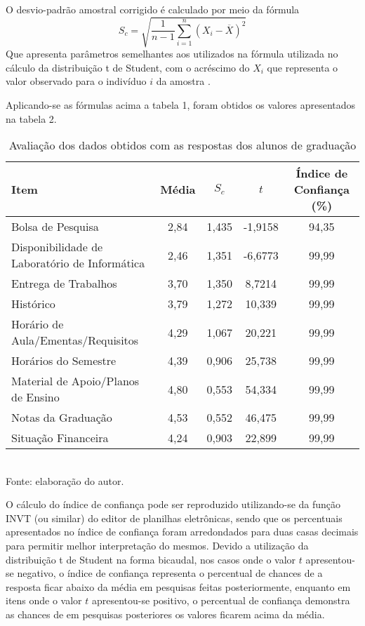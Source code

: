 O desvio-padrão amostral corrigido é calculado por meio da fórmula 
\[
   S_c = \sqrt{\frac{1}{n-1} \sum_{i=1}^n(X_i - \overline{X})^2} 
\]
Que apresenta parâmetros semelhantes aos utilizados na fórmula utilizada no cálculo da distribuição t de Student, com o acréscimo do $X_i$ que representa o valor observado para o indivíduo $i$ da amostra
\cite{DistroStudent}.

Aplicando-se as fórmulas acima a tabela 1, foram obtidos os valores apresentados na tabela 2.

\begin{table}[!hbt]
\centering
\caption[Avaliação dos dados obtidos - Graduação]{Avaliação dos dados obtidos com as respostas dos alunos de graduação}
\vspace{3mm}
\begin{tabular}{p{5cm}|c|c|c|c}\hline
\textbf{Item} & \textbf{Média} & \textbf{$S_c$} & \textbf{$t$} & \textbf{Índice de Confiança (\%)} \\ \hline
Bolsa de Pesquisa & 2,84 & 1,435 & -1,9158 & 94,35 \\ \hline
Disponibilidade de Laboratório de Informática & 2,46 & 1,351 & -6,6773 & 99,99 \\ \hline
Entrega de Trabalhos & 3,70 & 1,350 & 8,7214 & 99,99 \\ \hline
Histórico & 3,79 & 1,272 & 10,339 & 99,99 \\ \hline
Horário de Aula/Ementas/Requisitos & 4,29 & 1,067 & 20,221 & 99,99  \\ \hline
Horários do Semestre & 4,39 & 0,906 & 25,738 & 99,99 \\ \hline
Material de Apoio/Planos de Ensino & 4,80 & 0,553 & 54,334 & 99,99 \\ \hline
Notas da Graduação & 4,53 & 0,552 & 46,475 & 99,99 \\ \hline
Situação Financeira & 4,24 & 0,903 & 22,899 & 99,99 \\ \hline
\end{tabular}
\\ Fonte: elaboração do autor.
\end{table}

O cálculo do índice de confiança pode ser reproduzido utilizando-se da função INVT (ou similar) do editor de planilhas eletrônicas, sendo que os percentuais apresentados no índice de confiança foram arredondados para duas casas decimais para permitir melhor interpretação do mesmos. 
Devido a utilização da  distribuição t de Student na forma bicaudal, nos casos onde o valor $t$ apresentou-se negativo, o índice de confiança representa o percentual de chances de a resposta ficar abaixo da média em pesquisas feitas posteriormente, enquanto em itens onde o valor $t$ apresentou-se positivo, o percentual de confiança demonstra as chances de em pesquisas posteriores os valores ficarem acima da média.

